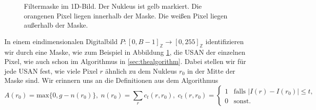 \documentclass[a4paper, 11pt]{report}
\theoremstyle{definition}
\begin{document}
				\begin{figure}[H]
					\begin{center}
						\caption{Filtermaske im 1D-Bild. Der Nukleus ist gelb markiert. Die orangenen Pixel liegen innerhalb der Maske. Die weißen Pixel liegen außerhalb der Maske.}
						\label{fig:def_maske_1d}
					\end{center}
				\end{figure}

	 			In einem eindimensionalen Digitalbild $P: [0,B-1]_\mathbb{Z} \to [0,255]_\mathbb{Z}$ identifizieren wir durch eine Maske, wie zum Beispiel in Abbildung \ref{fig:def_maske_1d}, die USAN der einzelnen Pixel, wie auch schon im Algorithmus in \ref{sec:thealgorithm}. Dabei stellen wir für jede USAN fest, wie viele Pixel $r$ ähnlich zu dem Nukleus $r_0$ in der Mitte der Maske sind. Wir erinnern uns an die Definitionen aus dem Algorithmus
				$$
				A(r_0) = \text{max}\{0, g - n(r_0)\},\;
				n(r_0) = \sum_r c_t(r, r_0),\;
				c_t(r, r_0) =
					\begin{cases}
						1 	& \text{falls } |I(r) - I(r_0)| \leq t, 	\\
						0 	& \text{sonst.}
					\end{cases}
				$$
\end{document}
